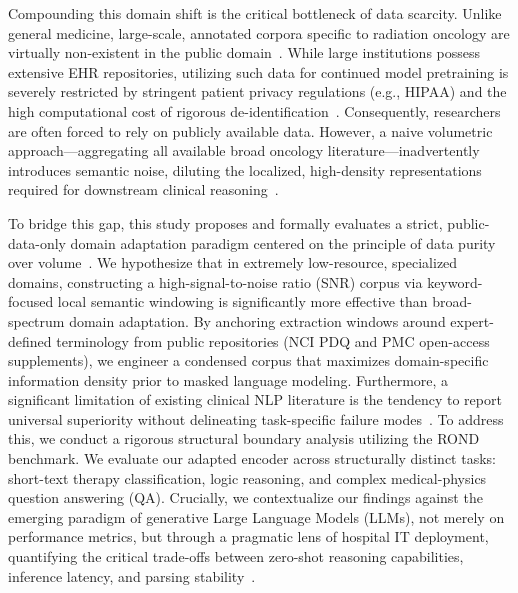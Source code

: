 \documentclass[a4paper,fleqn]{cas-dc}
\begin{document}
Compounding this domain shift is the critical bottleneck of data scarcity. Unlike general medicine, large-scale, annotated corpora specific to radiation oncology are virtually non-existent in the public domain~\cite{lin2024natural}. While large institutions possess extensive EHR repositories, utilizing such data for continued model pretraining is severely restricted by stringent patient privacy regulations (e.g., HIPAA) and the high computational cost of rigorous de-identification~\cite{hou2025fine, aljohani2025comprehensive}. Consequently, researchers are often forced to rely on publicly available data. However, a naive volumetric approach—aggregating all available broad oncology literature—inadvertently introduces semantic noise, diluting the localized, high-density representations required for downstream clinical reasoning~\cite{ding20253ds, kim2025medical}.


To bridge this gap, this study proposes and formally evaluates a strict, public-data-only domain adaptation paradigm centered on the principle of data purity over volume~\cite{zhou2023lima}. We hypothesize that in extremely low-resource, specialized domains, constructing a high-signal-to-noise ratio (SNR) corpus via keyword-focused local semantic windowing is significantly more effective than broad-spectrum domain adaptation. By anchoring extraction windows around expert-defined terminology from public repositories (NCI PDQ and PMC open-access supplements), we engineer a condensed corpus that maximizes domain-specific information density prior to masked language modeling. Furthermore, a significant limitation of existing clinical NLP literature is the tendency to report universal superiority without delineating task-specific failure modes~\cite{wornow2023shaky}. To address this, we conduct a rigorous structural boundary analysis utilizing the ROND benchmark. We evaluate our adapted encoder across structurally distinct tasks: short-text therapy classification, logic reasoning, and complex medical-physics question answering (QA). Crucially, we contextualize our findings against the emerging paradigm of generative Large Language Models (LLMs), not merely on performance metrics, but through a pragmatic lens of hospital IT deployment, quantifying the critical trade-offs between zero-shot reasoning capabilities, inference latency, and parsing stability~\cite{jiang2023health, moor2023foundation}. 
\end{document}
